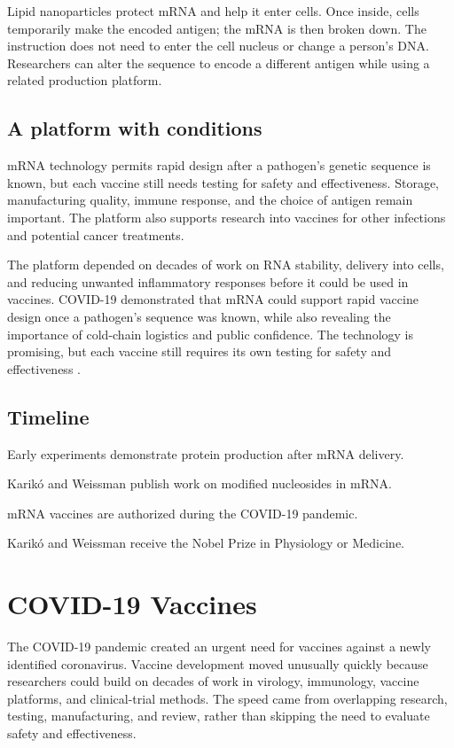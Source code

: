 \documentclass[12pt,oneside]{book}
\begin{document}
Lipid nanoparticles protect mRNA and help it enter cells. Once inside, cells
temporarily make the encoded antigen; the mRNA is then broken down. The
instruction does not need to enter the cell nucleus or change a person's
DNA. Researchers can alter the sequence to encode a different antigen while
using a related production platform.

\section{A platform with conditions}
mRNA technology permits rapid design after a pathogen's genetic sequence is
known, but each vaccine still needs testing for safety and effectiveness.
Storage, manufacturing quality, immune response, and the choice of antigen
remain important. The platform also supports research into vaccines for
other infections and potential cancer treatments.

The platform depended on decades of work on RNA stability, delivery into
cells, and reducing unwanted inflammatory responses before it could be used in
vaccines. COVID-19 demonstrated that mRNA could support rapid vaccine design
once a pathogen’s sequence was known, while also revealing the importance of
cold-chain logistics and public confidence. The technology is promising, but
each vaccine still requires its own testing for safety and effectiveness
\cite{nobelMRNA}.

\section*{Timeline}
\begin{description}[leftmargin=2.3cm,style=nextline]
  \item[1990s] Early experiments demonstrate protein production after mRNA delivery.
  \item[2005] Karik\'o and Weissman publish work on modified nucleosides in mRNA.
  \item[2020] mRNA vaccines are authorized during the COVID-19 pandemic.
  \item[2023] Karik\'o and Weissman receive the Nobel Prize in Physiology or Medicine.
\end{description}
\chapter[COVID-19 Vaccines]{COVID-19 Vaccines}

The COVID-19 pandemic created an urgent need for vaccines against a newly
identified coronavirus. Vaccine development moved unusually quickly because
researchers could build on decades of work in virology, immunology, vaccine
platforms, and clinical-trial methods. The speed came from overlapping
research, testing, manufacturing, and review, rather than skipping the need
to evaluate safety and effectiveness.
\end{document}
